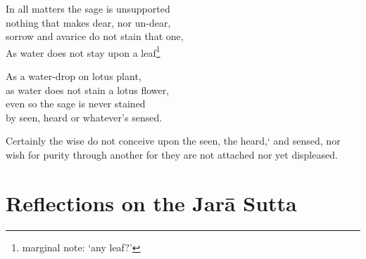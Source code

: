 \begin{MyDescription}{}
In all matters the sage is unsupported\\
nothing that makes dear, nor un-dear,\\
sorrow and avarice do not stain that one,\\
As water does not stay upon a leaf\footnote{marginal note: `any leaf?'}
\end{MyDescription}

\begin{MyDescription}{}
As a water-drop on lotus plant,\\
as water does not stain a lotus flower,\\
even so the sage is never stained\\
by seen, heard or whatever's sensed.
\end{MyDescription}

\begin{MyDescription}{}
Certainly the wise do not conceive
upon the seen, the heard,` and sensed,
nor wish for purity through another
for they are not attached nor yet displeased.
\end{MyDescription}

\begin{MyDescription}[(Sn. 804-813)]{}

\end{MyDescription}

\newpage

\section{Reflections on the Jar\=a Sutta}

